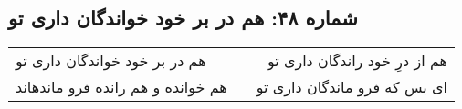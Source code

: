 \begin{center}
\section*{شماره ۴۸: هم در بر خود خواندگان داری تو}
\label{sec:048}
\begin{longtable}{l p{0.5cm} r}
هم در بر خود خواندگان داری تو
&&
هم از درِ خود راندگان داری تو
\\
هم خوانده و هم رانده فرو ماندهاند
&&
ای بس که فرو ماندگان داری تو
\\
\end{longtable}
\end{center}

